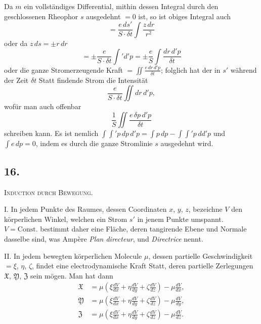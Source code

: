 \documentclass[fontsize=10pt,paper=a5,pagesize=auto]{scrbook}
\newcommand{\origpage}[1]{\marginpar{\footnotesize\textit{S. #1}}}
\begin{document}
Da $m$ ein vollständiges Differential, mithin dessen Integral durch den geschlossenen Rheophor $s$ ausgedehnt $= 0$ ist, so ist obiges Integral auch
\[
= \frac{e \, ds'}{S \cdot \delta t} \int \frac{z \, dr}{r^2}
\]
oder da $z \, ds = \pm r \, dr$
\[
= \pm \frac{e}{S \cdot \delta t} \int' d'p = \pm \frac{e}{S} \int \frac{dr \, d'p}{\delta t}
\]
oder die ganze Stromerzeugende Kraft $= \iint \frac{e \, dr \, d'p}{\delta t}$; folglich hat der in $s'$ während der Zeit $\delta t$ Statt findende Strom die Intensität
\[
\frac{e}{S \cdot \delta t} \iint dr \, d'p,
\]
wofür man auch offenbar
\[
\frac{1}{S} \iint \frac{e \, \delta p \, d'p}{\delta t}
\]
schreiben kann. Es ist nemlich $\int \int' p \, dp \, d'p = \int p \, dp - \int \int' p \, dd'p$ und $\int e \, dp = 0$, indem es durch die ganze Stromlinie $s$ ausgedehnt wird.


\subsection*{16.}
\origpage{613}
\textsc{Induction durch Bewegung.}

\textsc{I.} In jedem Punkte des Raumes, dessen Coordinaten $x$, $y$, $z$, bezeichne $V$ den körperlichen Winkel, welchen ein Strom $s'$ in jenem Punkte umspannt. $V = \mathrm{Const.}$ bestimmt daher eine Fläche, deren tangirende Ebene und Normale dasselbe sind, was Ampère \textit{Plan directeur}, und \textit{Directrice} nennt.

\textsc{II.} In jedem bewegten körperlichen Molecule $\mu$, dessen partielle Geschwindigkeit $= \xi$, $\eta$, $\zeta$, findet eine electrodynamische Kraft Statt, deren partielle Zerlegungen $\mathfrak{X}$, $\mathfrak{Y}$, $\mathfrak{Z}$ sein mögen. Man hat dann
\begin{align*}
\mathfrak{X} &= \mu \left( \xi \frac{dV}{dx} + \eta \frac{dV}{dy} + \zeta \frac{dV}{dz} \right) - \mu \frac{dV}{dx},\\
\mathfrak{Y} &= \mu \left( \xi \frac{dV}{dx} + \eta \frac{dV}{dy} + \zeta \frac{dV}{dz} \right) - \mu \frac{dV}{dy},\\
\mathfrak{Z} &= \mu \left( \xi \frac{dV}{dx} + \eta \frac{dV}{dy} + \zeta \frac{dV}{dz} \right) - \mu \frac{dV}{dz}.
\end{align*}
\end{document}
